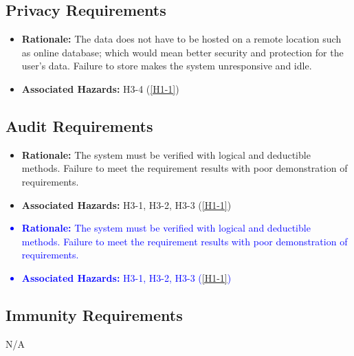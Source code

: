 \documentclass{article}
\newcounter{Sreqnum} %
\begin{document}
\begin{itemize}
\subsection{Privacy Requirements}
\item[SR\refstepcounter{Sreqnum}\theSreqnum
\label{PR1}:] 
\begin{itemize}
    \item \textbf{Rationale:} The data does not have to be hosted on a remote location such as online database; which would mean better security and protection for the user's data. Failure to store makes the system unresponsive and idle. 
    \item \textbf{Associated Hazards:} H3-4 (\ref{H1-1})
\end{itemize}

\subsection{Audit Requirements}
\item[SR\refstepcounter{Sreqnum}\theSreqnum
\label{ADR1}:] 
\begin{itemize}
    \item \textbf{Rationale:} The system must be verified with logical and deductible methods. Failure to meet the requirement results with poor demonstration of requirements.
    \item \textbf{Associated Hazards:} H3-1, H3-2, H3-3 (\ref{H1-1})
\end{itemize}
\textcolor{blue}{
\item[SR\refstepcounter{Sreqnum}\theSreqnum
\label{ADR1}:] 
\begin{itemize}
    \item \textbf{Rationale:} The system must be verified with logical and deductible methods. Failure to meet the requirement results with poor demonstration of requirements.
    \item \textbf{Associated Hazards:} H3-1, H3-2, H3-3 (\ref{H1-1})
\end{itemize}}

\subsection{Immunity Requirements}
N/A

\end{itemize}
\end{document}
